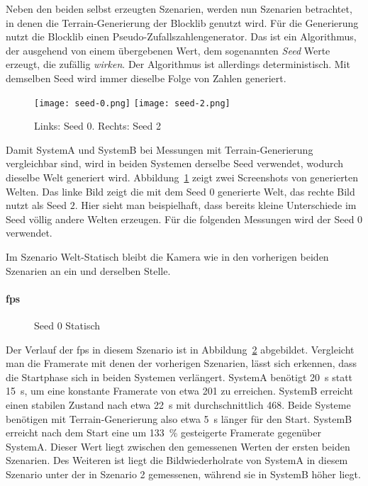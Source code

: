 Neben den beiden selbst erzeugten Szenarien, werden nun Szenarien betrachtet, in denen die Terrain-Generierung der Blocklib genutzt wird. Für die Generierung nutzt die Blocklib einen Pseudo-Zufallszahlengenerator. Das ist ein Algorithmus, der ausgehend von einem übergebenen Wert, dem sogenannten \emph{Seed} Werte erzeugt, die zufällig \emph{wirken}. Der Algorithmus ist allerdings deterministisch. Mit demselben Seed wird immer dieselbe Folge von Zahlen generiert.

\begin{figure}
	\centering
	\texttt{[image: seed-0.png]}
	\hfill
	\texttt{[image: seed-2.png]}
	\caption{Links: Seed 0. Rechts: Seed 2}\label{fig:static}
\end{figure}
Damit SystemA und SystemB bei Messungen mit Terrain-Generierung vergleichbar sind, wird in beiden Systemen derselbe Seed verwendet, wodurch dieselbe Welt generiert wird. Abbildung~\ref{fig:static} zeigt zwei Screenshots von generierten Welten. Das linke Bild zeigt die mit dem Seed $0$ generierte Welt, das rechte Bild nutzt als Seed $2$. Hier sieht man beispielhaft, dass bereits kleine Unterschiede im Seed völlig andere Welten erzeugen. Für die folgenden Messungen wird der Seed $0$ verwendet. 

Im Szenario Welt-Statisch bleibt die Kamera wie in den vorherigen beiden Szenarien an ein und derselben Stelle.



\paragraph{\ac{fps}}
\begin{figure}[!htbp]
	\caption{Seed 0 Statisch}\label{fig:seed-0-static-fps}
\end{figure}
Der Verlauf der \ac{fps} in diesem Szenario ist in Abbildung~\ref{fig:seed-0-static-fps} abgebildet. Vergleicht man die Framerate mit denen der vorherigen Szenarien, lässt sich erkennen, dass die Startphase sich in beiden Systemen verlängert. SystemA benötigt \SI{20}{\second} statt \SI{15}{\second}, um eine konstante Framerate von etwa \SI{201}{\fps} zu erreichen. SystemB erreicht einen stabilen Zustand nach etwa \SI{22}{\second} mit durchschnittlich \SI{468}{\fps}.
Beide Systeme benötigen mit Terrain-Generierung also etwa \SI{5}{\second} länger für den Start. SystemB erreicht nach dem Start eine um \SI{133}{\percent} gesteigerte Framerate gegenüber SystemA. Dieser Wert liegt zwischen den gemessenen Werten der ersten beiden Szenarien. Des Weiteren ist liegt die Bildwiederholrate von SystemA in diesem Szenario unter der in Szenario 2 gemessenen, während sie in SystemB höher liegt.

